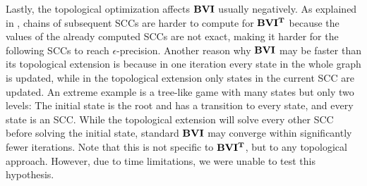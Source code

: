 Lastly, the topological optimization affects $\mathbf{BVI}$ usually negatively. As explained in \cite{gandalf}, 
chains of subsequent SCCs are harder to compute for $\mathbf{BVI^T}$ because the values of the already computed SCCs are not exact, 
making it harder for the following SCCs to reach $\epsilon$-precision.
Another reason why $\mathbf{BVI}$ may be faster than its topological extension is because in one iteration every state in the whole graph is updated, 
while in the topological extension only states in the current SCC are updated.
An extreme example is a tree-like game with many states but only two levels: 
The initial state is the root and has a transition to every state, and every state is an SCC.
While the topological extension will solve every other SCC before solving the initial state, standard $\mathbf{BVI}$ may converge within significantly fewer iterations.
Note that this is not specific to $\mathbf{BVI^T}$, but to any topological approach.
However, due to time limitations, we were unable to test this hypothesis.
\FloatBarrier

